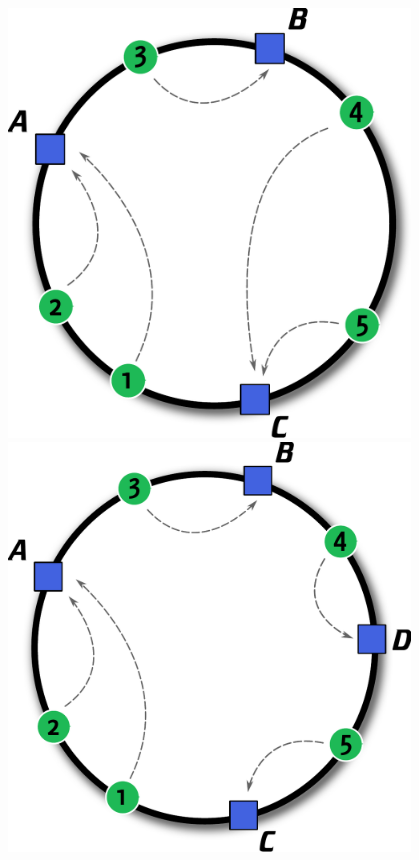 \documentclass[a4paper,11pt]{scrartcl}
\begin{document}
\begin{figure}[ht]
\centering
\begin{minipage}[b]{0.445\linewidth}
\centering
\includegraphics[width=0.95\textwidth]{img/consistent.pdf}
\end{minipage}
\begin{minipage}[b]{0.47\linewidth}
\centering
\includegraphics[width=0.95\textwidth]{img/consistent_2.pdf}

\end{minipage}
\end{figure}
\end{document}
